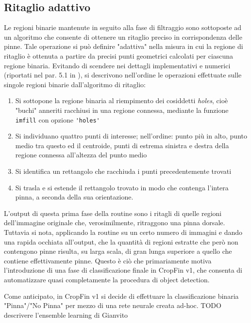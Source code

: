 \subsection*{Ritaglio adattivo}
Le regioni binarie mantenute in seguito alla fase di filtraggio sono sottoposte ad un algoritmo che consente di ottenere un ritaglio preciso in corrispondenza delle pinne.
Tale operazione si può definire "adattiva" nella misura in cui la regione di ritaglio è ottenuta a partire da precisi punti geometrici calcolati per ciascuna regione binaria.
Evitando di scendere nei dettagli implementativi e numerici (riportati nel par. 5.1 in \cite{gianvito}), si descrivono nell'ordine le operazioni effettuate sulle singole regioni binarie dall'algoritmo di ritaglio:
\begin{enumerate}
\item Si sottopone la regione binaria al riempimento dei cosiddetti \textit{holes}, cioè "buchi" anneriti racchiusi in una regione connessa, mediante la funzione \verb|imfill| con opzione \verb|'holes'|
\item Si individuano quattro punti di interesse; nell’ordine: punto più in alto, punto medio tra questo ed il centroide, punti di estrema sinistra e destra della regione connessa all’altezza del
punto medio
\item Si identifica un rettangolo che racchiuda i punti precedentemente trovati
\item Si trasla e si estende il rettangolo trovato in modo che contenga l’intera pinna, a seconda della sua orientazione.
\end{enumerate}

L'output di questa prima fase della routine sono i ritagli di quelle regioni dell'immagine originale che, verosimilmente, ritraggono una pinna dorsale.
Tuttavia si nota, applicando la routine su un certo numero di immagini e dando una rapida occhiata all'output, che la quantità di regioni estratte che però non contengono pinne risulta, su larga scala, di gran lunga superiore a quello che contiene effettivamente pinne. Questo è ciò che primariamente motiva l’introduzione di una fase di classificazione finale in CropFin v1, che consenta di automatizzare quasi completamente la procedura di object detection.

Come anticipato, in CropFin v1 si decide di effettuare la classificazione binaria "Pinna"/"No Pinna" per mezzo di una rete neurale creata ad-hoc. 
TODO descrivere l'ensemble learning di Gianvito